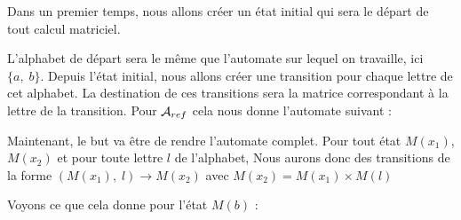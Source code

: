 \documentclass[12pt]{memoir}
\begin{document}
Dans un premier temps, nous allons créer un état initial qui sera le départ de tout calcul matriciel.

\begin{center}
\end{center}
$\ $\\

L'alphabet de départ sera le même que l'automate sur lequel on travaille, ici $\{a,\;b\}$. Depuis l'état initial, nous allons créer une transition pour chaque lettre de cet alphabet. La destination de ces transitions sera la matrice correspondant à la lettre de la transition. Pour $\mathcal{A}_{ref}$ cela nous donne l'automate suivant :

\begin{center}
\end{center}
$\ $\\

Maintenant, le but va être de rendre l'automate complet. Pour tout état
$M(x_{1})$, $M(x_{2})$ et pour toute lettre $l$ de l'alphabet, Nous aurons donc
des transitions de la forme $(M(x_{1}),\; l) \rightarrow M(x_{2})$  avec
$M(x_{2}) = M(x_{1}) \times M(l)$

\medskip\noindent
Voyons ce que cela donne pour l'état $M(b)$ :

\begin{center}
\end{center}
$\ $\\
 
\end{document}
